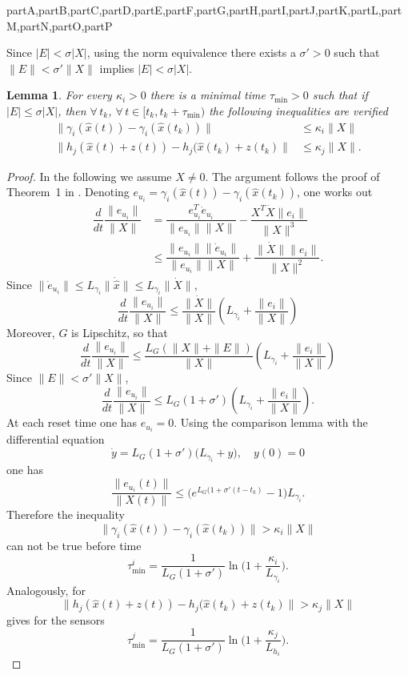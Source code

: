 \documentclass[letterpaper, 10 pt, conference]{ieeeconf}
\def\compile{partA,partB,partC,partD,partE,partF,partG,partH,partI,partJ,partK,partL,partM,partN,partO,partP}
\newenvironment{partK}[1][]{}{}  \newenvironment{partL}[1][]{}{}
\newtheorem{lemma}{Lemma}
\begin{document}
\begin{xcomment}{\compile}
\begin{partJ}
Since $|E|<\sigma |X|$, using the norm equivalence there exists a $\sigma'>0$ such that $\|E\|<\sigma'\|X\|$ implies $|E|<\sigma |X|$.

\medskip
\begin{lemma}\label{lemma3} For every $\kappa_i>0$ there is a minimal time $\tau_{\min}>0$ such that if $|E|\le \sigma|X|$, then $\forall \, t_k$, $\forall \, t\in [t_k,t_k+\tau_{\min})$ the following inequalities are verified
$$
\begin{aligned}
\|\gamma_i(\hat x(t))-\gamma_i(\hat x(t_k))\|&\le \kappa_i\|X\|  \\
\|h_j(\hat x(t)+z(t))-h_j(\hat x(t_k)+z(t_k)\|&\le\kappa_j\|X\|.
\end{aligned}
$$
\end{lemma}


\end{partJ}
\begin{partK} 

\medskip
\begin{proof} In the following we assume $X\ne 0$. The argument follows the proof of Theorem~1 in \cite{Tabuada 2007}. Denoting $e_{u_i}=\gamma_i(\hat x(t))-\gamma_i(\hat x(t_k))$, one works out
$$
\begin{aligned}
\dfrac{d}{dt}\dfrac{\|e_{u_i}\|}{\|X\|}&=\dfrac{e_{u_i}^T\dot e_{u_i}}{\|e_{u_i}\| \|X\|}-\dfrac{X^T\dot X\|e_i\|}{\|X\|^3} \\
                                       &\le \dfrac{\|e_{u_i}\|\|\dot e_{u_i}\|}{\|e_{u_i}\| \|X\|}+\dfrac{\|\dot X\|\|e_i\|}{\|X\|^2}.
\end{aligned}                                       
$$
Since $\|\dot e_{u_i}\|\le L_{\gamma_i} \|\dot{\hat x}\|\le L_{\gamma_i} \|\dot X\|$,
$$
\dfrac{d}{dt}\dfrac{\|e_{u_i}\|}{\|X\|}\le \dfrac{\|\dot{X}\|}{\|X\|}\left(L_{\gamma_i}+\dfrac{\|e_i\|}{\|X\|}\right)
$$
Moreover, $G$ is Lipschitz, so that
$$
\dfrac{d}{dt}\dfrac{\|e_{u_i}\|}{\|X\|}\le \dfrac{L_G(\|X\|+\|E\|)}{\|X\|}\left(L_{\gamma_i}+\dfrac{\|e_i\|}{\|X\|}\right)
$$
Since $\|E\|< \sigma' \|X\|$,
$$
\dfrac{d}{dt}\dfrac{\|e_{u_i}\|}{\|X\|}\le L_G(1+\sigma')\left(L_{\gamma_i}+\dfrac{\|e_i\|}{\|X\|}\right).
$$
At each reset time one has $e_{u_i}=0$. Using the comparison lemma with the differential equation 
$$
\dot y=L_G(1+\sigma')\big(L_{\gamma_i}+y\big),\quad y(0)=0
$$
one has
$$
\dfrac{\|e_{u_i}(t)\|}{\|X(t)\|}\le \big(e^{L_G(1+\sigma'(t-t_k)}-1\big)L_{\gamma_i} .
$$
Therefore the inequality 
$$
\|\gamma_i(\hat x(t))-\gamma_i(\hat x(t_k))\|>\kappa_i\|X\|
$$
can not be true before time 
$$
\tau_{\min}^i=\dfrac{1}{L_G(1+\sigma')}\ln\big(1+\dfrac{\kappa_i}{L_{\gamma_i}}\big).
$$
Analogously, for 
$$
\|h_j(\hat x(t)+z(t))-h_j(\hat x(t_k)+z(t_k)\|>\kappa_j\|X\|
$$
gives for the sensors 
$$
\tau_{\min}^j=\dfrac{1}{L_G(1+\sigma')}\ln\big(1+\dfrac{\kappa_j}{L_{h_i}}\big).
$$
\end{proof}


\end{partK}
\end{xcomment}
\end{document}
